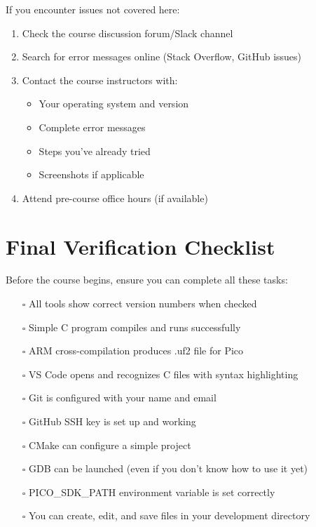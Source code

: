\documentclass[11pt,a4paper]{article}
\begin{document}
If you encounter issues not covered here:

\begin{enumerate}
    \item Check the course discussion forum/Slack channel
    \item Search for error messages online (Stack Overflow, GitHub issues)
    \item Contact the course instructors with:
    \begin{itemize}
        \item Your operating system and version
        \item Complete error messages
        \item Steps you've already tried
        \item Screenshots if applicable
    \end{itemize}
    \item Attend pre-course office hours (if available)
\end{enumerate}

\section{Final Verification Checklist}

Before the course begins, ensure you can complete all these tasks:

\begin{itemize}
    \item[$\square$] All tools show correct version numbers when checked
    \item[$\square$] Simple C program compiles and runs successfully
    \item[$\square$] ARM cross-compilation produces .uf2 file for Pico
    \item[$\square$] VS Code opens and recognizes C files with syntax highlighting
    \item[$\square$] Git is configured with your name and email
    \item[$\square$] GitHub SSH key is set up and working
    \item[$\square$] CMake can configure a simple project
    \item[$\square$] GDB can be launched (even if you don't know how to use it yet)
    \item[$\square$] PICO\_SDK\_PATH environment variable is set correctly
    \item[$\square$] You can create, edit, and save files in your development directory
\end{itemize}
\end{document}
